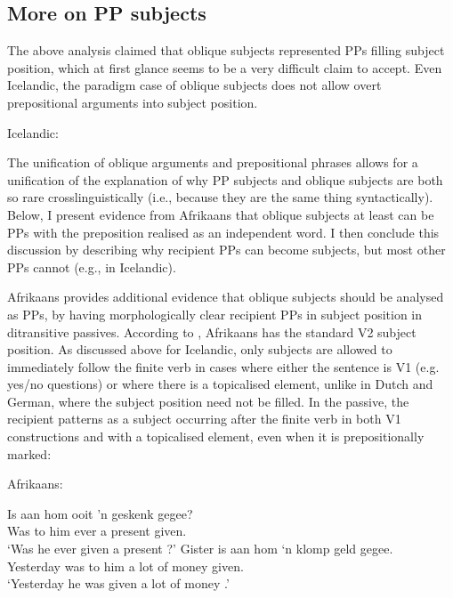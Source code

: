 \subsection{More on PP subjects}
The above analysis claimed that oblique subjects represented PPs filling subject position, which at first glance seems to be a very difficult claim to accept. Even Icelandic, the paradigm case of oblique subjects does not allow overt prepositional arguments into subject position. 

\begin{exe}
	\ex Icelandic:\label{ex:ice-ppsbj}
	\begin{xlist}
	\end{xlist}
\end{exe}

The unification of oblique arguments and prepositional phrases allows for a unification of the explanation of why PP subjects and oblique subjects are both so rare crosslinguistically (i.e., because they are the same thing syntactically). Below, I present evidence from Afrikaans that oblique subjects at least can be PPs with the preposition realised as an independent word. I then conclude this discussion by describing why recipient PPs can become subjects, but most other PPs cannot (e.g., in Icelandic).

Afrikaans provides additional evidence that oblique subjects should be analysed as PPs, by having morphologically clear recipient PPs in subject position in ditransitive passives. According to \cite{Stadler.1996}, Afrikaans has the standard V2 subject position. As discussed above for Icelandic, only subjects are allowed to immediately follow the finite verb in cases where either the sentence is V1 (e.g. yes/no questions) or where there is a topicalised element, unlike in Dutch and German, where the subject position need not be filled. In the passive, the recipient patterns as a subject occurring after the finite verb in both V1 constructions and with a topicalised element, even when it is prepositionally marked:
\begin{exe}
	\ex Afrikaans: \label{ex:af-rec-pass1}
\begin{xlist}
\ex \gll Is aan hom ooit 'n geskenk gegee?\\
Was to him ever a present given.\\
\trans `Was he ever given a present \citep[ex. 49]{Stadler.1996}?'
\ex \gll Gister is aan hom `n klomp geld gegee.\\
Yesterday was to him a {lot of} money given.\\
\trans `Yesterday he was given a lot of money \citep[ex. 50]{Stadler.1996}.'
\end{xlist}
\end{exe}

